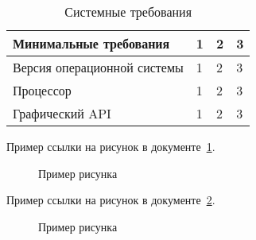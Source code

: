 \begin{table}[H]
\caption{\label{t1}Системные требования}
\begin{tabular}{|p{3 cm}|p{3 cm}|p{3 cm}|p{5 cm}|}
\hline
Минимальные требования & 1 & 2 & 3 \\ \hline
Версия операционной системы & 1 & 2 & 3 \\ \hline
Процессор & 1 & 2 & 3 \\ \hline
Графический API & 1 & 2 & 3 \\ \hline
\end{tabular}
\end{table}

Пример ссылки на рисунок в документе~\ref{fig:example01}.
\begin{figure}[h]
    \centering
    \caption{Пример рисунка}
    \label{fig:example01}
\end{figure}

Пример ссылки на рисунок в документе~\ref{fig:example04}.
\begin{figure}[h]
    \centering
    \caption{Пример рисунка}
    \label{fig:example04}
\end{figure}
